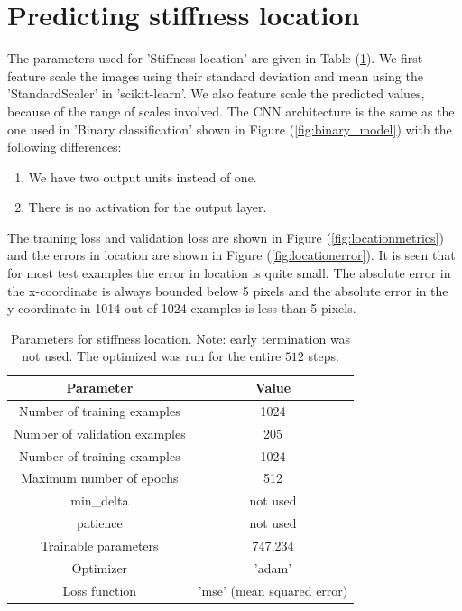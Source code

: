 \documentclass{article}
\begin{document}
\section{Predicting stiffness location}
%
The parameters used for 'Stiffness location' are given in Table (\ref{tab:stifflocparam}). We first feature scale the images using their standard deviation and mean using the 'StandardScaler' in 'scikit-learn'. We also feature scale the predicted values, because of the range of scales involved. The CNN architecture is the same as the one used in 'Binary classification' shown in Figure (\ref{fig:binary_model}) with the following differences:
\begin{enumerate}
\item{We have two output units instead of one.}
\item{There is no activation for the output layer.}
\end{enumerate}
The training loss and validation loss are shown in Figure (\ref{fig:locationmetrics}) and the errors in location are shown in Figure (\ref{fig:locationerror}). It is seen that for most test examples the error in location is quite small. The absolute error in the x-coordinate is always bounded below 5 pixels and the absolute error in the y-coordinate in 1014 out of 1024 examples is less than 5 pixels.
\begin{table}
  \centering
  \begin{tabular}{|c|c|}
    \hline
    Parameter & Value \\
    \hline
    Number of training examples   & 1024 \\
    Number of validation examples & 205 \\
    Number of training examples   & 1024 \\
    Maximum number of epochs      & 512 \\
    min{\_}delta      & not used\\
    patience                      & not used  \\
    Trainable parameters          & 747,234\\
    Optimizer         & 'adam'     \\
    Loss function     & 'mse' (mean squared error) \\
    \hline
  \end{tabular}
  \caption{\label{tab:stifflocparam} Parameters for stiffness location. Note: early termination was not used. The optimized was run for the entire $512$ steps.}
\end{table}
\end{document}
